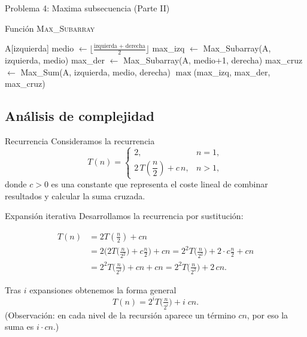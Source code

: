 \documentclass{beamer}
\begin{document}
\begin{frame}{Problema 4: Maxima subsecuencia (Parte II)}
\begin{algorithm}[H]
\caption{Función \textsc{Max\_Subarray}}
\begin{algorithmic}[1]
    \State \Return A[izquierda]
  \EndIf
  \State medio $\gets \lfloor \tfrac{\text{izquierda + derecha}}{2} \rfloor$
  \State max\_izq $\gets$ Max\_Subarray(A, izquierda, medio)
  \State max\_der $\gets$ Max\_Subarray(A, medio+1, derecha)
  \State max\_cruz $\gets$ Max\_Sum(A, izquierda, medio, derecha)
  \State \Return $\max$(max\_izq, max\_der, max\_cruz)
\EndFunction
\end{algorithmic}
\end{algorithm}
\end{frame}

\subsection{Análisis de complejidad}
\begin{frame}{Recurrencia}
Consideramos la recurrencia
\[
T(n)=
\begin{cases}
2, & n=1,\\[6pt]
2\,T\!\left(\dfrac{n}{2}\right) + c\,n, & n>1,
\end{cases}
\]
donde \(c>0\) es una constante que representa el coste lineal de combinar resultados y calcular la suma cruzada.
\end{frame}

\begin{frame}{Expansión iterativa}
Desarrollamos la recurrencia por sustitución:

\[
\begin{aligned}
T(n) &= 2T\!\left(\tfrac{n}{2}\right) + c n\\[4pt]
     &= 2\Big(2T\!\big(\tfrac{n}{2^2}\big) + c\tfrac{n}{2}\Big) + c n
      = 2^2 T\!\big(\tfrac{n}{2^2}\big) + 2\cdot c\tfrac{n}{2} + c n\\[4pt]
     &= 2^2 T\!\big(\tfrac{n}{2^2}\big) + c n + c n
     = 2^2 T\!\big(\tfrac{n}{2^2}\big) + 2\,c n.
\end{aligned}
\]

Tras \(i\) expansiones obtenemos la forma general
\[
T(n)=2^{i}T\!\big(\tfrac{n}{2^{i}}\big) + i\; c n.
\]
(Observación: en cada nivel de la recursión aparece un término \(c n\), por eso la suma es \(i\cdot c n\).)
\end{frame}
\end{document}
